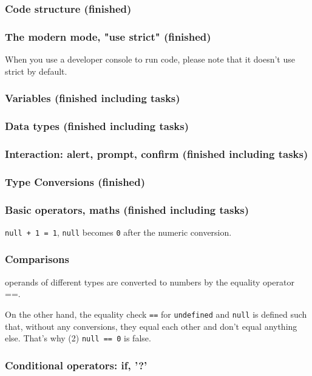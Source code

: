 \documentclass[a4paper, 12pt]{article}
\begin{document}
\subsubsection{Code structure (finished)}
\subsubsection{The modern mode, "use strict" (finished)}
When you use a developer console to run code, please note that it doesn't use strict by default.

\subsubsection{Variables (finished including tasks)}

\subsubsection{Data types (finished including tasks)}

\subsubsection{Interaction: alert, prompt, confirm (finished including tasks)}
\subsubsection{Type Conversions (finished)}
\subsubsection{Basic operators, maths (finished including tasks)}
\verb|null + 1 = 1|, \verb|null| becomes \verb|0| after the numeric conversion.

\subsubsection{Comparisons}
operands of different types are converted to numbers by the equality operator ==.

On the other hand, the equality check \verb|==| for \verb|undefined| and \verb|null| is defined such that, without any conversions, they equal each other and don't equal anything else. That's why (2) \verb|null == 0| is false.

\subsubsection{Conditional operators: if, '?'}
\end{document}
